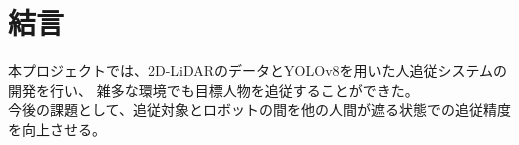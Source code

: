\section{結言}

本プロジェクトでは、2D-LiDARのデータとYOLOv8を用いた人追従システムの開発を行い、
雑多な環境でも目標人物を追従することができた。\\ \indent
今後の課題として、追従対象とロボットの間を他の人間が遮る状態での追従精度を向上させる。